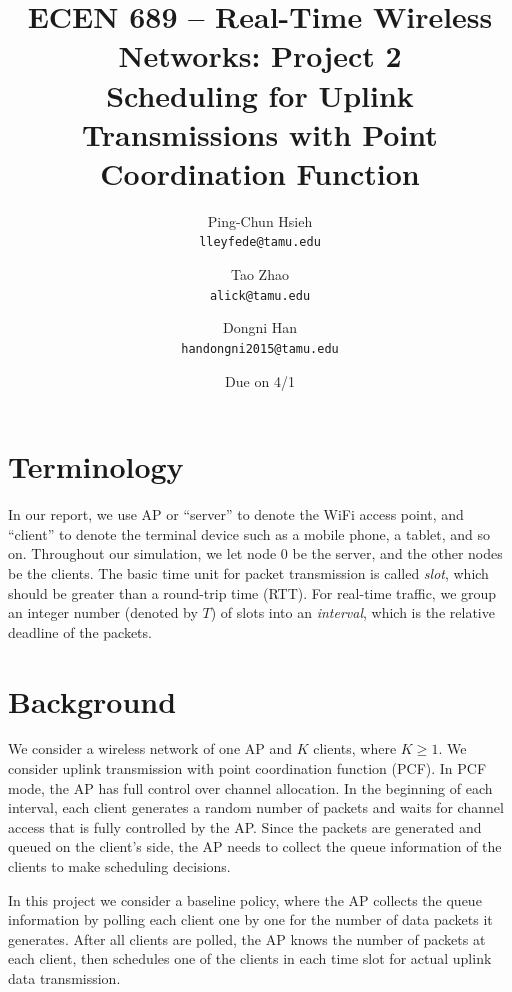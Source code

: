 \documentclass{article}
\begin{document}
\title{\bfseries ECEN 689 -- Real-Time Wireless Networks: Project 2\\
Scheduling for Uplink Transmissions with Point Coordination Function}
\date{Due on 4/1}
\author{%
Ping-Chun Hsieh\\
\texttt{lleyfede@tamu.edu}
\and
Tao Zhao\\
\texttt{alick@tamu.edu}
\and
Dongni Han\\
\texttt{handongni2015@tamu.edu}
}
\maketitle

\section*{Terminology}

In our report, we use AP or ``server'' to denote the WiFi access point, and
``client'' to denote the terminal device such as a mobile phone, a tablet, and
so on. Throughout our simulation, we let node $0$ be the server, and the other nodes be the clients. The basic time unit for packet transmission is called \emph{slot}, which should be greater than a round-trip time (RTT). For real-time traffic, we group an integer number (denoted by $T$) of slots into an \emph{interval}, which is the relative deadline of the packets.

\section{Background}

We consider a wireless network of one AP and $K$ clients,
where $K\ge1$. We consider uplink transmission with point coordination function (PCF).
In PCF mode, the AP has full control over channel allocation. In the beginning of each interval, each client generates a random number of packets and waits for channel access that is fully controlled by the AP. Since the packets are generated and queued on the client's side, the AP needs to collect the queue information of the clients to make scheduling decisions.

In this project we consider a baseline policy, where the AP collects the queue
information by polling each client one by one for the number of data packets it
generates.
After all clients are polled, the AP knows the number of packets at each client,
then schedules one of the clients in each time slot for actual uplink data transmission.
\end{document}
